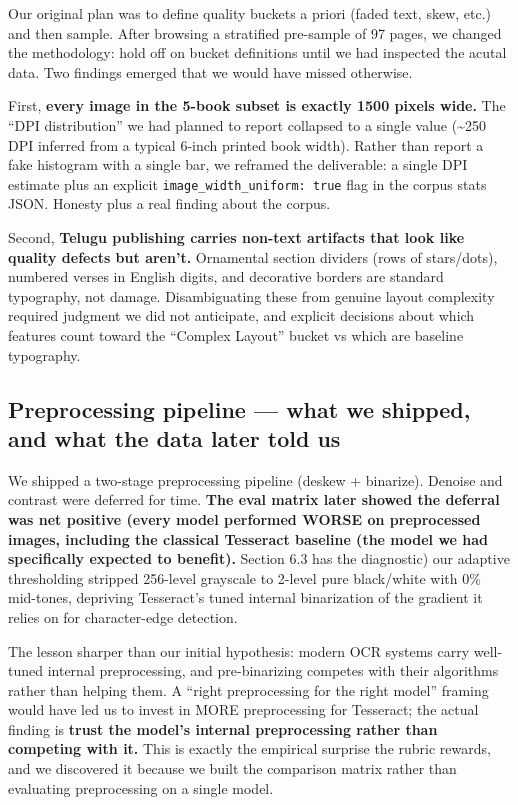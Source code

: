 \documentclass[
  letterpaper,
  DIV=11,
  numbers=noendperiod]{scrartcl}
\begin{document}
Our original plan was to define quality buckets a priori (faded text,
skew, etc.) and then sample. After browsing a stratified pre-sample of
97 pages, we changed the methodology: hold off on bucket definitions
until we had inspected the acutal data. Two findings emerged that we
would have missed otherwise.

First, \textbf{every image in the 5-book subset is exactly 1500 pixels
wide.} The ``DPI distribution'' we had planned to report collapsed to a
single value (\textasciitilde250 DPI inferred from a typical 6-inch
printed book width). Rather than report a fake histogram with a single
bar, we reframed the deliverable: a single DPI estimate plus an explicit
\texttt{image\_width\_uniform:\ true} flag in the corpus stats JSON.
Honesty plus a real finding about the corpus.

Second, \textbf{Telugu publishing carries non-text artifacts that look
like quality defects but aren't.} Ornamental section dividers (rows of
stars/dots), numbered verses in English digits, and decorative borders
are standard typography, not damage. Disambiguating these from genuine
layout complexity required judgment we did not anticipate, and explicit
decisions about which features count toward the ``Complex Layout''
bucket vs which are baseline typography.

\subsection{Preprocessing pipeline --- what we shipped, and what the
data later told
us}\label{preprocessing-pipeline-what-we-shipped-and-what-the-data-later-told-us}

We shipped a two-stage preprocessing pipeline (deskew + binarize).
Denoise and contrast were deferred for time. \textbf{The eval matrix
later showed the deferral was net positive (every model performed WORSE
on preprocessed images, including the classical Tesseract baseline (the
model we had specifically expected to benefit).} Section 6.3 has the
diagnostic) our adaptive thresholding stripped 256-level grayscale to
2-level pure black/white with 0\% mid-tones, depriving Tesseract's tuned
internal binarization of the gradient it relies on for character-edge
detection.

The lesson sharper than our initial hypothesis: modern OCR systems carry
well-tuned internal preprocessing, and pre-binarizing competes with
their algorithms rather than helping them. A ``right preprocessing for
the right model'' framing would have led us to invest in MORE
preprocessing for Tesseract; the actual finding is \textbf{trust the
model's internal preprocessing rather than competing with it.} This is
exactly the empirical surprise the rubric rewards, and we discovered it
because we built the comparison matrix rather than evaluating
preprocessing on a single model.
\end{document}
